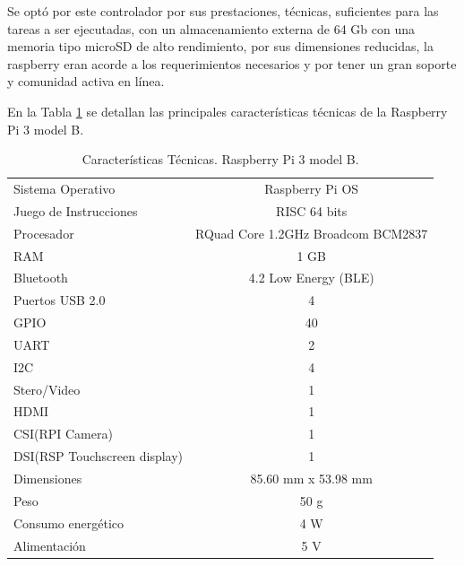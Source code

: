 \begin{itemize}
    Se optó por este controlador por sus prestaciones,  t\'ecnicas, suficientes para las tareas a ser ejecutadas, con un almacenamiento externa de 64 Gb con una memoria tipo microSD de alto rendimiento, por sus dimensiones reducidas, la raspberry  eran acorde a los requerimientos necesarios y por tener un gran soporte y comunidad activa en l\'inea.
 
    En la Tabla \ref{tab:carac_rasp} se detallan las principales características técnicas de la Raspberry Pi 3 model B.
 
 \begin{table}[t]
      \protect\caption[Características Técnicas. Raspberry Pi 3 model B]{Características Técnicas. Raspberry Pi 3 model B.  \label{tab:carac_rasp}}
    
     \centering
     \begin{tabular}{l c}
        \toprule
           Sistema Operativo & Raspberry Pi OS\\
          Juego de Instrucciones & RISC 64 bits\\
          Procesador & RQuad Core 1.2GHz Broadcom BCM2837\\
          RAM  & 1 GB\\
          Bluetooth &  4.2 Low Energy (BLE)\\
          Puertos USB 2.0 & 4\\
          GPIO& 40\\
          UART& 2\\
          I2C& 4\\
          Stero/Video & 1\\
          HDMI & 1\\
          CSI(RPI Camera) & 1\\
          DSI(RSP Touchscreen display) & 1\\
          Dimensiones & 85.60 mm x 53.98 mm\\
          Peso & 50 g\\
          Consumo energ\'etico & 4 W\\
          Alimentaci\'on & 5 V\\
     \bottomrule   
     \end{tabular}
     \vspace{5mm}

\end{table}
\end{itemize}
